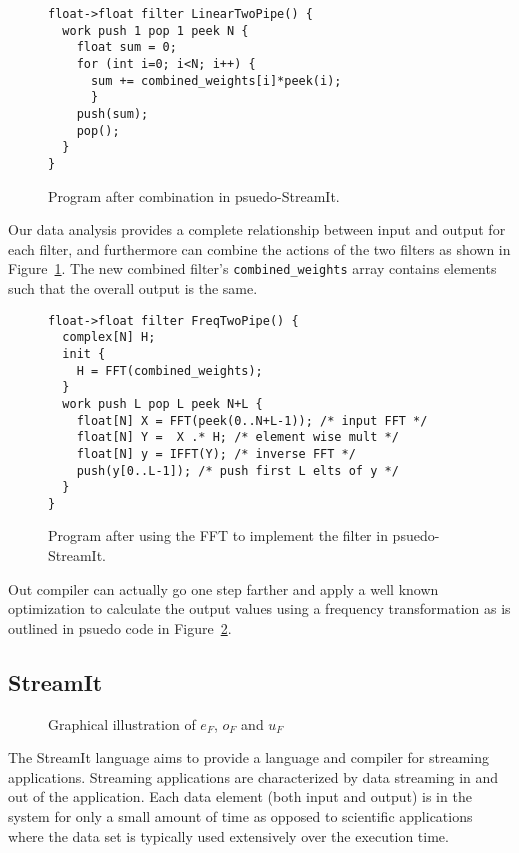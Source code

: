 \begin{figure}
\begin{verbatim}
float->float filter LinearTwoPipe() {
  work push 1 pop 1 peek N {
    float sum = 0;
    for (int i=0; i<N; i++) {
      sum += combined_weights[i]*peek(i);
      }
    push(sum);
    pop();
  }
}
\end{verbatim}
\caption{Program after combination in psuedo-StreamIt.}
\label{fig:example-combine}
\end{figure}

Our data analysis provides a complete relationship between input and output for
each filter, and furthermore can combine the actions of the two filters as shown
in Figure~\ref{fig:example-combine}. The new combined filter's {\tt combined\_weights}
array contains elements such that the overall output is the same.

\begin{figure}
\begin{verbatim}
float->float filter FreqTwoPipe() {
  complex[N] H;
  init {
    H = FFT(combined_weights);
  }
  work push L pop L peek N+L {
    float[N] X = FFT(peek(0..N+L-1)); /* input FFT */
    float[N] Y =  X .* H; /* element wise mult */
    float[N] y = IFFT(Y); /* inverse FFT */
    push(y[0..L-1]); /* push first L elts of y */
  }
}
\end{verbatim}
\caption{Program after using the FFT to implement the filter in psuedo-StreamIt.}
\label{fig:example-frequency}
\end{figure}

Out compiler can actually go one step farther and apply a well known 
optimization to calculate the output values using a frequency transformation
as is outlined in psuedo code in Figure~\ref{fig:example-frequency}.




\subsection{StreamIt}

\begin{figure}
\center
\epsfxsize=3.0in
\caption{Graphical illustration of $e_{F}$, $o_{F}$ and $u_{F}$}
\label{fig:overview-filter}
\end{figure}


The StreamIt\cite{streamitcc, streamit-asplos, gordon-thesis} language
aims to provide a language and compiler for streaming applications. Streaming applications 
are characterized by data streaming in and out of the application. Each data element (both
input and output) is in the system for only a small amount of time as opposed to scientific
applications where the data set is typically used extensively over the execution time.

